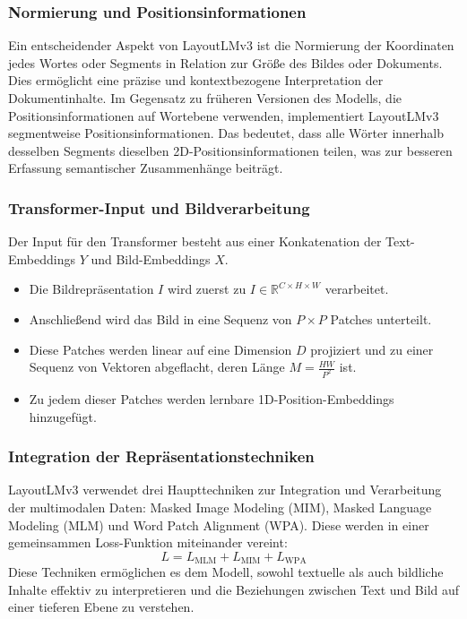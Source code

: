 \documentclass[12pt,a4paper,twoside]{article}
\begin{document}
\subsubsection{Normierung und Positionsinformationen}
Ein entscheidender Aspekt von LayoutLMv3 ist die Normierung der Koordinaten jedes Wortes oder Segments in Relation zur Größe des Bildes oder Dokuments. Dies ermöglicht eine präzise und kontextbezogene Interpretation der Dokumentinhalte. Im Gegensatz zu früheren Versionen des Modells, die Positionsinformationen auf Wortebene verwenden, implementiert LayoutLMv3 segmentweise Positionsinformationen. Das bedeutet, dass alle Wörter innerhalb desselben Segments dieselben 2D-Positionsinformationen teilen, was zur besseren Erfassung semantischer Zusammenhänge beiträgt.

\subsubsection{Transformer-Input und Bildverarbeitung}
Der Input für den Transformer besteht aus einer Konkatenation der Text-Embeddings \(Y\) und Bild-Embeddings \(X\).
\begin{itemize}
    \item Die Bildrepräsentation \(I\) wird zuerst zu \(I \in \mathbb{R}^{C \times H \times W}\) verarbeitet.
    \item Anschließend wird das Bild in eine Sequenz von \(P \times P\) Patches unterteilt.
    \item Diese Patches werden linear auf eine Dimension \(D\) projiziert und zu einer Sequenz von Vektoren abgeflacht, deren Länge \(M = \frac{HW}{P^2}\) ist.
    \item Zu jedem dieser Patches werden lernbare 1D-Position-Embeddings hinzugefügt.
\end{itemize}

\subsubsection{Integration der Repräsentationstechniken}
LayoutLMv3 verwendet drei Haupttechniken zur Integration und Verarbeitung der multimodalen Daten: Masked Image Modeling (MIM), Masked Language Modeling (MLM) und Word Patch Alignment (WPA). Diese werden in einer gemeinsammen Loss-Funktion miteinander vereint: \[L = L_{\text{MLM}} + L_{\text{MIM}} + L_{\text{WPA}}\] Diese Techniken ermöglichen es dem Modell, sowohl textuelle als auch bildliche Inhalte effektiv zu interpretieren und die Beziehungen zwischen Text und Bild auf einer tieferen Ebene zu verstehen.
\end{document}
